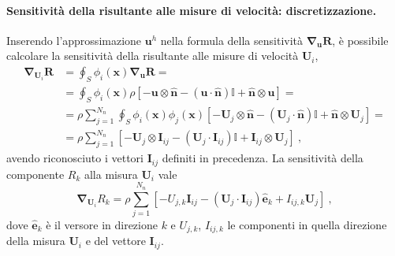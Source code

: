 \paragraph{Sensitività della risultante alle misure di velocità: discretizzazione.}
Inserendo l'approssimazione $\bm{u}^h$ nella formula della sensitività $\bm{\nabla}_{\bm{u}} \bm{R}$, è possibile calcolare la sensitività della risultante alle misure di velocità $\bm{U}_i$,
\begin{equation}\label{eqn:sens:RU}
\begin{aligned}
 \bm{\nabla}_{\bm{U}_i} \bm{R} & = \oint_S \phi_i(\bm{x}) \bm{\nabla}_{\bm{u}} \bm{R} =\\
 & = \oint_S \phi_i(\bm{x}) \rho \left[ - \bm{u} \otimes \bm{\hat{n}} - (\bm{u} \cdot \bm{\hat{n}})\mathbb{I} + \bm{\hat{n}} \otimes \bm{u} \right]  = \\
 & = \rho \displaystyle\sum_{j=1}^{N_n} \oint_S \phi_i(\bm{x}) \phi_j(\bm{x}) \left[ - \bm{U}_j \otimes \bm{\hat{n}} - (\bm{U}_j \cdot \bm{\hat{n}})\mathbb{I} + \bm{\hat{n}} \otimes \bm{U}_j \right]  = \\
 & = \rho \displaystyle\sum_{j=1}^{N_n} \left[ - \bm{U}_j \otimes \bm{I}_{ij} - (\bm{U}_j \cdot \bm{I}_{ij})\mathbb{I} + \bm{I}_{ij} \otimes \bm{U}_j \right] \ ,
\end{aligned}
\end{equation}
avendo riconosciuto i vettori $\bm{I}_{ij}$ definiti in precedenza. La sensitività della componente $R_k$ alla misura $\bm{U}_i$ vale
\begin{equation}
 \bm{\nabla}_{\bm{U}_i} R_k =  
  \rho \displaystyle\sum_{j=1}^{N_n} \left[ - U_{j,k} \bm{I}_{ij} - (\bm{U}_j \cdot \bm{I}_{ij}) \bm{\hat{e}}_k + I_{ij,k} \bm{U}_j \right] \ ,
\end{equation}
dove $\bm{\hat{e}}_k$ è il versore in direzione $k$ e $U_{j,k}$, $I_{ij,k}$ le componenti in quella direzione della misura $\bm{U}_i$ e del vettore $\bm{I}_{ij}$.

